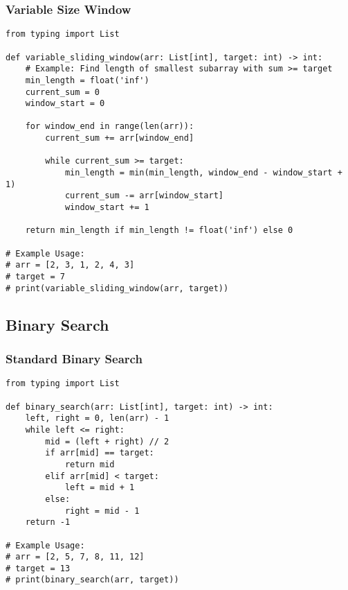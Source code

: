 \documentclass[11pt, a4paper]{article}
\begin{document}
\subsubsection{Variable Size Window}
\begin{verbatim}
from typing import List

def variable_sliding_window(arr: List[int], target: int) -> int:
    # Example: Find length of smallest subarray with sum >= target
    min_length = float('inf')
    current_sum = 0
    window_start = 0
    
    for window_end in range(len(arr)):
        current_sum += arr[window_end]
        
        while current_sum >= target:
            min_length = min(min_length, window_end - window_start + 1)
            current_sum -= arr[window_start]
            window_start += 1
            
    return min_length if min_length != float('inf') else 0

# Example Usage:
# arr = [2, 3, 1, 2, 4, 3]
# target = 7
# print(variable_sliding_window(arr, target))
\end{verbatim}

\subsection{Binary Search}
\subsubsection{Standard Binary Search}
\begin{verbatim}
from typing import List

def binary_search(arr: List[int], target: int) -> int:
    left, right = 0, len(arr) - 1
    while left <= right:
        mid = (left + right) // 2
        if arr[mid] == target:
            return mid
        elif arr[mid] < target:
            left = mid + 1
        else:
            right = mid - 1
    return -1

# Example Usage:
# arr = [2, 5, 7, 8, 11, 12]
# target = 13
# print(binary_search(arr, target))
\end{verbatim}
\end{document}
